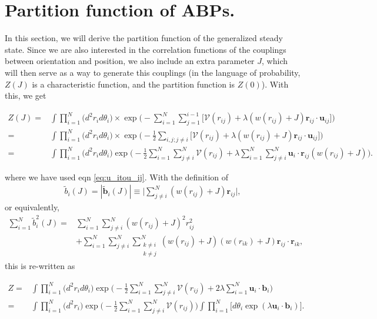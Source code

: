 \documentclass[twocolumn,amsmath,amssymb,aps]{revtex4-1}%
\begin{document}
\section{Partition function of ABPs. \label{app:statmech}}
In this section, we will derive the partition function of the
generalized steady state. Since we are also interested in the
correlation functions of the couplings between orientation and
position, we also include an extra parameter $J$, which will
then serve as a way to generate this couplings (in the language
of probability, $Z(J)$ is a characteristic function, and the
partition function is $Z(0)$). With this, we get
\begin{widetext}
\begin{align}\label{appeq:genfunc}
  Z(J)
  =&\int\prod_{i=1}^N\big(d^2r_id\theta_i)
  \times\exp\bigg(-\sum_{i=1}^N\sum_{j=1}^{i-1}\big[
    \mathcal{V}(r_{ij})+\lambda (w(r_{ij})+J)\bm{r}_{ij}
    \cdot\bm{u}_{ij}\big]\bigg)\nonumber\\
  =&\int\prod_{i=1}^N\big(d^2r_id\theta_i)
  \times\exp\bigg(-\frac{1}{2}\sum_{i,j;j\neq i}\big[
    \mathcal{V}(r_{ij})+\lambda (w(r_{ij})+J)\bm{r}_{ij}
    \cdot\bm{u}_{ij}\big]\bigg)\nonumber\\
  =&\int\prod_{i=1}^N\big(d^2r_id\theta_i)
  \exp\bigg(-\frac{1}{2}\sum_{i=1}^N\sum_{j\neq i}^N
  \mathcal{V}(r_{ij})
  +\lambda\sum_{i=1}^N\sum_{j\neq i}^N\bm{u}_{i}
  \cdot \bm{r}_{ij}(w(r_{ij})+J)\bigg).
\end{align}
\end{widetext}
where we have used eqn \ref{eq:u_itou_ij}. With the definition of
\begin{align}\label{appeq:b_i}
  \tilde{b}_i(J) = |\tilde{\bm{b}}_i(J)|\equiv
  \bigg|\sum_{j\neq i}^N(w(r_{ij})+J)
  \bm{r}_{ij}\bigg|,
\end{align}
or equivalently,
\begin{align}\label{appeq:b_i2}
  \sum_{i=1}^N\tilde{b}_i^2(J)
  =&\sum_{i=1}^N\sum_{j\neq i}^N(w(r_{ij})+J)^2r_{ij}^2\nonumber\\
  &+\sum_{i=1}^N\sum_{j\neq i}^N\sum_{\substack{k\neq i \\ k\neq j}}^N
  (w(r_{ij})+J)(w(r_{ik})+J)\bm{r}_{ij}\cdot\bm{r}_{ik},
\end{align}
this is re-written as
\begin{widetext}
\begin{align}
  Z=&\int\prod_{i=1}^N\big(d^2r_id\theta_i)
     \exp\bigg(-\frac{1}{2}\sum_{i=1}^N\sum_{j\neq i}^N
     \mathcal{V}(r_{ij})+2\lambda\sum_{i=1}^N\bm{u}_{i}
     \cdot \bm{b}_{i}\bigg)\nonumber\\
  =&\int\prod_{i=1}^N\big(d^2r_i)
     \exp\bigg(-\frac{1}{2}\sum_{i=1}^N\sum_{j\neq i}^N
     \mathcal{V}(r_{ij})\bigg)\int\prod_{i=1}^N\bigg[d\theta_i
     \exp(\lambda\bm{u}_{i}\cdot \bm{b}_{i})\bigg].
\end{align}
\end{widetext}
\end{document}
